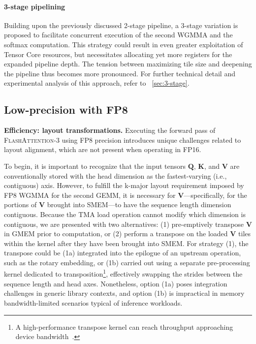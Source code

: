 \begin{algorithm}[H]
\begin{algorithmic}[1]
\paragraph{3-stage pipelining} Building upon the previously discussed 2-stage pipeline, a 3-stage variation is proposed to facilitate concurrent execution of the second WGMMA and the softmax computation. This strategy could result in even greater exploitation of Tensor Core resources, but necessitates allocating yet more registers for the expanded pipeline depth. The tension between maximizing tile size and deepening the pipeline thus becomes more pronounced. For further technical detail and experimental analysis of this approach, refer to ~\cref{sec:3-stage}.

\subsection{Low-precision with FP8}
\label{sec:algofp8}

\textbf{Efficiency: layout transformations.} Executing the forward pass of \textsc{FlashAttention-3} using FP8 precision introduces unique challenges related to layout alignment, which are not present when operating in FP16.

To begin, it is important to recognize that the input tensors $\mathbf{Q}$, $\mathbf{K}$, and $\mathbf{V}$ are conventionally stored with the head dimension as the fastest-varying (i.e., contiguous) axis. However, to fulfill the k-major layout requirement imposed by FP8 WGMMA for the second GEMM, it is necessary for $\mathbf{V}$—specifically, for the portions of $\mathbf{V}$ brought into SMEM—to have the sequence length dimension contiguous. Because the TMA load operation cannot modify which dimension is contiguous, we are presented with two alternatives: (1) pre-emptively transpose $\mathbf{V}$ in GMEM prior to computation, or (2) perform a transpose on the loaded $\mathbf{V}$ tiles within the kernel after they have been brought into SMEM. For strategy (1), the transpose could be (1a) integrated into the epilogue of an upstream operation, such as the rotary embedding, or (1b) carried out using a separate pre-processing kernel dedicated to transposition\footnote{A high-performance transpose kernel can reach throughput approaching device bandwidth~\citep{colfax_cutlass_transpose_2024}.}, effectively swapping the strides between the sequence length and head axes. Nonetheless, option (1a) poses integration challenges in generic library contexts, and option (1b) is impractical in memory bandwidth-limited scenarios typical of inference workloads.


\end{algorithmic}
\end{algorithm}
